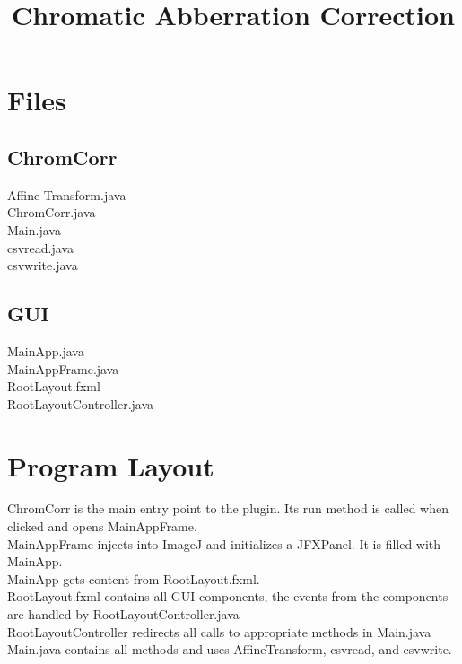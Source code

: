 \documentclass{article}
\begin{document}
\title{Chromatic Abberration Correction}
\maketitle

\section{Files}
\subsection*{ChromCorr}
Affine Transform.java \\
ChromCorr.java \\
Main.java \\
csvread.java \\
csvwrite.java
\subsection*{GUI}
MainApp.java \\
MainAppFrame.java \\
RootLayout.fxml \\
RootLayoutController.java
\section{Program Layout}
ChromCorr is the main entry point to the plugin. Its run method is called when clicked and opens MainAppFrame. \\
MainAppFrame injects into ImageJ and initializes a JFXPanel. It is filled with MainApp. \\
MainApp gets content from RootLayout.fxml. \\
RootLayout.fxml contains all GUI components, the events from the components are handled by RootLayoutController.java \\
RootLayoutController redirects all calls to appropriate methods in Main.java \\
Main.java contains all methods and uses AffineTransform, csvread, and csvwrite.
\end{document}
